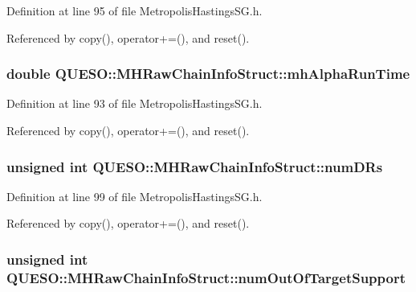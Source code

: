 Definition at line 95 of file Metropolis\-Hastings\-S\-G.\-h.



Referenced by copy(), operator+=(), and reset().

\hypertarget{struct_q_u_e_s_o_1_1_m_h_raw_chain_info_struct_a16d5d703c764352dfe30dfaa25ce8b8b}{
\subsubsection[{mh\-Alpha\-Run\-Time}]{\setlength{\rightskip}{0pt plus 5cm}double Q\-U\-E\-S\-O\-::\-M\-H\-Raw\-Chain\-Info\-Struct\-::mh\-Alpha\-Run\-Time}}\label{struct_q_u_e_s_o_1_1_m_h_raw_chain_info_struct_a16d5d703c764352dfe30dfaa25ce8b8b}


Definition at line 93 of file Metropolis\-Hastings\-S\-G.\-h.



Referenced by copy(), operator+=(), and reset().

\hypertarget{struct_q_u_e_s_o_1_1_m_h_raw_chain_info_struct_a993b070bd796dd176f4168be05f11ce9}{
\subsubsection[{num\-D\-Rs}]{\setlength{\rightskip}{0pt plus 5cm}unsigned int Q\-U\-E\-S\-O\-::\-M\-H\-Raw\-Chain\-Info\-Struct\-::num\-D\-Rs}}\label{struct_q_u_e_s_o_1_1_m_h_raw_chain_info_struct_a993b070bd796dd176f4168be05f11ce9}


Definition at line 99 of file Metropolis\-Hastings\-S\-G.\-h.



Referenced by copy(), operator+=(), and reset().

\hypertarget{struct_q_u_e_s_o_1_1_m_h_raw_chain_info_struct_a601f798ee4dc28cfa6b342fc04a8c841}{
\subsubsection[{num\-Out\-Of\-Target\-Support}]{\setlength{\rightskip}{0pt plus 5cm}unsigned int Q\-U\-E\-S\-O\-::\-M\-H\-Raw\-Chain\-Info\-Struct\-::num\-Out\-Of\-Target\-Support}}\label{struct_q_u_e_s_o_1_1_m_h_raw_chain_info_struct_a601f798ee4dc28cfa6b342fc04a8c841}


